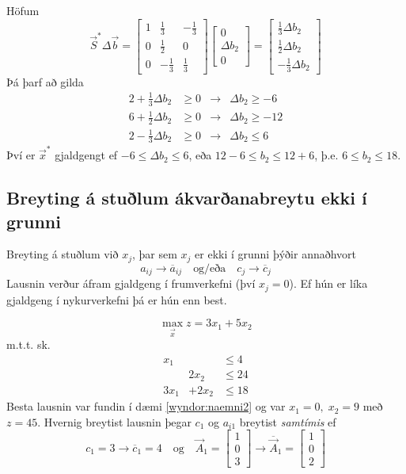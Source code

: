 \begin{lausn}Höfum $$\vec{S}^*\Delta\vec{b}=\begin{bmatrix}1 &\frac{1}{3}&-\frac{1}{3}\\0 &\frac{1}{2} & 0\\0&-\frac{1}{3}&\frac{1}{3}\end{bmatrix}\begin{bmatrix}0\\\Delta b_2\\0\end{bmatrix}=\begin{bmatrix}\frac{1}{3}\Delta b_2\\\frac{1}{2}\Delta b_2\\-\frac{1}{3}\Delta b_2\end{bmatrix}$$
Þá þarf að gilda
\[\begin{array}{cccl}
2+\frac{1}{3}\Delta b_2 &\geq 0 & \rightarrow &\Delta b_2\geq-6 \\
6+\frac{1}{2}\Delta b_2 &\geq 0 & \rightarrow &\Delta b_2\geq-12 \\
2-\frac{1}{3}\Delta b_2 &\geq 0 & \rightarrow &\Delta b_2\leq6 
\end{array}\]
Því er $\vec{x}^*$ gjaldgengt ef $-6\leq\Delta b_2\leq 6$, eða $12-6\leq b_2\leq 12+6$, þ.e. $6\leq b_2\leq 18$.
\end{lausn}
\subsection{Breyting á stuðlum ákvarðanabreytu ekki í grunni}\label{breyting:nonbasic}
Breyting á stuðlum við $x_j$, þar sem $x_j$ er ekki í grunni þýðir annaðhvort
$$ a_{ij}\rightarrow \overline{a}_{ij}\quad\mbox{og/eða}\quad c_j\rightarrow\overline{c}_j$$
Lausnin verður áfram gjaldgeng í frumverkefni (því $x_j=0$). Ef hún er líka gjaldgeng í nykurverkefni þá er hún enn best.
\begin{daemi}\label{daemi:wyndor:afbrigdi}$$\max_{\vec{x}} z=3x_1+5x_2$$ m.t.t. sk. \[\begin{array}{crl} x_1 & &\leq 4\\&2x_2&\leq24\\3x_1&+2x_2&\leq18\end{array}\]
Besta lausnin var fundin í dæmi \ref{wyndor:naemni2} og var $x_1=0,\;x_2=9$ með $z=45$.
Hvernig breytist lausnin þegar $c_1$ og $a_{i1}$ breytist \emph{samtímis} ef 
$$ c_1=3\rightarrow \overline{c}_1=4\quad\mbox{og}\quad \vec{A}_1=\begin{bmatrix}1\\0\\3\end{bmatrix}\rightarrow\overline{\vec{A}}_1=\begin{bmatrix}1\\0\\2\end{bmatrix}$$
\end{daemi}


